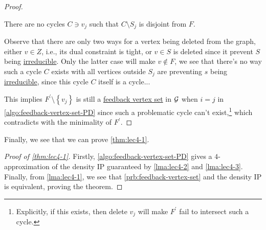 \begin{proof}
	\begin{claim}
		There are no cycles \(C\ni v_j\) such that \(C\setminus S_j\) is disjoint from \(F\).
	\end{claim}
	\begin{explanation}
		Observe that there are only two ways for a vertex being deleted from the graph, either \(v\in Z\), i.e., its dual constraint is tight, or \(v\in S\) is deleted since it prevent \(S\) being \hyperref[def:irreducible]{irreducible}. Only the latter case will make \(v \notin F\), we see that there's no way such a cycle \(C\) exists with all vertices outside \(S_j\) are preventing \(s\) being \hyperref[def:irreducible]{irreducible}, since this cycle \(C\) itself is a cycle...
	\end{explanation}

	This implies \(F^\prime \setminus \left\{ v_j \right\} \) is still a \hyperref[prb:feedback-vertex-set]{feedback vertex set} in \(\mathcal{\MakeUppercase{g}} \) when \(i = j\) in \autoref{algo:feedback-vertex-set-PD} since such a problematic cycle can't exist,\footnote{Explicitly, if this exists, then delete \(v_j\) will make \(F^\prime\) fail to intersect such a cycle.} which contradicts with the minimality of \(F^\prime\).
\end{proof}

Finally, we see that we can prove \autoref{thm:lec4-1}.

\begin{proof}[Proof of \autoref{thm:lec4-1}]
	Firstly, \autoref{algo:feedback-vertex-set-PD} gives a \(4\)-approximation of the density IP guaranteed by \autoref{lma:lec4-2} and \autoref{lma:lec4-3}. Finally, from \autoref{lma:lec4-1}, we see that \autoref{prb:feedback-vertex-set} and the density IP is equivalent, proving the theorem.
\end{proof}